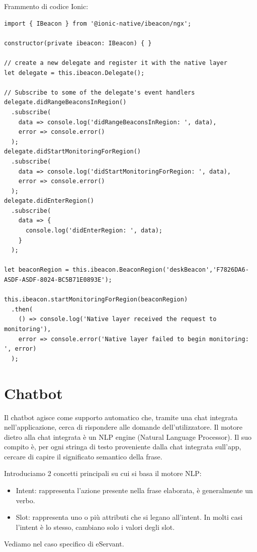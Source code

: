 Frammento di codice Ionic:
\begin{lstlisting}
import { IBeacon } from '@ionic-native/ibeacon/ngx';

constructor(private ibeacon: IBeacon) { }

// create a new delegate and register it with the native layer
let delegate = this.ibeacon.Delegate();

// Subscribe to some of the delegate's event handlers
delegate.didRangeBeaconsInRegion()
  .subscribe(
    data => console.log('didRangeBeaconsInRegion: ', data),
    error => console.error()
  );
delegate.didStartMonitoringForRegion()
  .subscribe(
    data => console.log('didStartMonitoringForRegion: ', data),
    error => console.error()
  );
delegate.didEnterRegion()
  .subscribe(
    data => {
      console.log('didEnterRegion: ', data);
    }
  );

let beaconRegion = this.ibeacon.BeaconRegion('deskBeacon','F7826DA6-ASDF-ASDF-8024-BC5B71E0893E');

this.ibeacon.startMonitoringForRegion(beaconRegion)
  .then(
    () => console.log('Native layer received the request to monitoring'),
    error => console.error('Native layer failed to begin monitoring: ', error)
  );
\end{lstlisting}

\section{Chatbot}

Il chatbot agisce come supporto automatico che, tramite una chat integrata nell'applicazione, cerca di rispondere
alle domande dell'utilizzatore.
Il motore dietro alla chat integrata è un NLP engine (Natural Language Processor).
Il suo compito è, per ogni stringa di testo proveniente dalla chat integrata sull'app, cercare di capire
il significato semantico della frase.

Introduciamo 2 concetti principali su cui si basa il motore NLP:

\begin{itemize}
\item Intent: rappresenta l'azione presente nella frase elaborata, è generalmente un verbo.
\item Slot: rappresenta uno o più attributi che si legano all'intent. In molti casi l'intent è lo stesso,
cambiano solo i valori degli slot.
\end{itemize}

Vediamo nel caso specifico di eServant.

